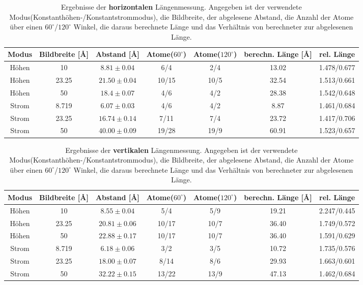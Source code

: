 \documentclass[12pt,a4paper]{article}
\begin{document}
\begin{table}
\begin{tabular}{|c|c|c||c|c||c|c|}
\hline 
Modus & Bildbreite [\si{\angstrom}] & Abstand [\si{\angstrom}] & Atome($60^{\circ}$) & Atome($120^{\circ}$) & berechn. Länge [\si{\angstrom}] & rel. Länge\\ 
\hline 
\hline 
Höhen & 10 & $8.81\pm 0.04$ & 6/4 & 2/4 & 13.02& 1.478/0.677\\ 
\hline 
Höhen & 23.25 & $21.50\pm 0.04$ & 10/15 & 10/5 & 32.54& 1.513/0.661\\ 
\hline 
Höhen & 50 & $18.4\pm 0.07$ & 4/6  & 4/2 & 28.38& 1.542/0.648\\ 
\hline 
\hline
Strom & 8.719 & $6.07\pm 0.03$ & 4/6 & 4/2 & 8.87& 1.461/0.684\\ 
\hline 
Strom & 23.25 & $16.74\pm 0.14$ & 7/11  & 7/4 & 23.72& 1.417/0.706\\ 
\hline 
Strom & 50 & $40.00\pm 0.09$ & 19/28  & 19/9 & 60.91& 1.523/0.657\\ 
\hline 
\end{tabular} 
\caption{Ergebnisse der \textbf{horizontalen} Längenmessung. Angegeben ist der verwendete Modus(Konstanthöhen-/Konstantstrommodus), die Bildbreite, der abgelesene Abstand, die Anzahl der Atome über einen $60^{\circ}$/$120^{\circ}$ Winkel, die daraus berechnete Länge und das Verhältnis von berechneter zur abgelesenen Länge.}
\label{tab:Atome_horizontal}
\end{table}

\begin{table}
\begin{tabular}{|c|c|c||c|c||c|c|}
\hline 
Modus & Bildbreite [\si{\angstrom}]  & Abstand [\si{\angstrom}] & Atome($60^{\circ}$) & Atome($120^{\circ}$) & berechn. Länge [\si{\angstrom}] & rel. Länge\\ 
\hline 
\hline 
Höhen & 10 & $8.55\pm 0.04$ & 5/4 & 5/9 & 19.21& 2.247/0.445\\ 
\hline 
Höhen & 23.25 & $20.81\pm 0.06$ & 10/17  & 10/7 & 36.40& 1.749/0.572\\ 
\hline 
Höhen & 50 & $22.88\pm 0.17$ & 10/17  & 10/7 & 36.40& 1.591/0.629\\ 
\hline 
\hline 
Strom & 8.719 & $6.18\pm 0.06$ & 3/2 & 3/5 & 10.72& 1.735/0.576\\ 
\hline 
Strom & 23.25 & $18.00\pm 0.07$ & 8/14  & 8/6 & 29.93& 1.663/0.601\\ 
\hline 
Strom & 50 & $32.22\pm 0.15$ & 13/22  & 13/9 & 47.13& 1.462/0.684\\ 
\hline 
\end{tabular} 
\caption{Ergebnisse der \textbf{vertikalen} Längenmessung. Angegeben ist der verwendete Modus(Konstanthöhen-/Konstantstrommodus), die Bildbreite, der abgelesene Abstand, die Anzahl der Atome über einen $60^{\circ}$/$120^{\circ}$ Winkel, die daraus berechnete Länge und das Verhältnis von berechneter zur abgelesenen Länge.}
\label{tab:Atome_vertikal}
\end{table}
\end{document}

